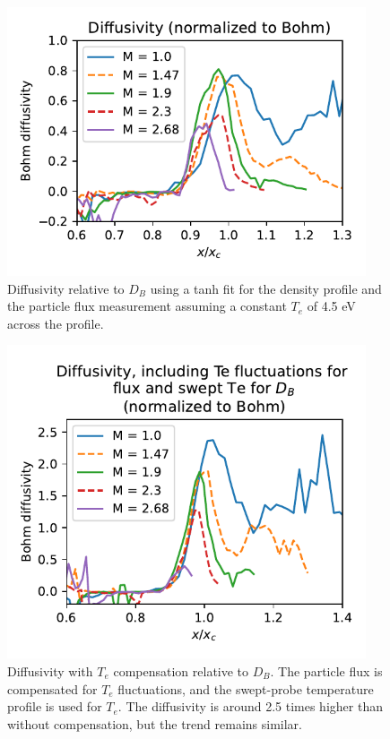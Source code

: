 \begin{figure}
    \centering
    \includegraphics[width=300pt]{figures/extra/diffusivity_tanh-prof-fit.pdf}
    \caption[Diffusivity relative to $D_B$]{Diffusivity relative to $D_B$ using a tanh fit for the density profile and the particle flux measurement assuming a constant $T_e$ of 4.5 eV across the profile.}
    \label{fig_extra:diffusivity_tanh}
\end{figure}

\begin{figure}
    \centering
    \includegraphics[width=300pt]{figures/extra/diffusivity_Te-comp.pdf}
    \caption[Diffusivity with $T_e$ compensation relative to $D_B$]{Diffusivity with $T_e$ compensation relative to $D_B$. The particle flux is compensated for $T_e$ fluctuations, and the swept-probe temperature profile is used for $T_e$. The diffusivity is around 2.5 times higher than without compensation, but the trend remains similar.}
    \label{fig_extra:diffusivity_Te-comp}
\end{figure}

